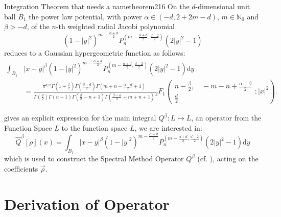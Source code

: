 





\begin{theorem}{Integration Theorem that needs a name}{theorem216}
  On the $d$-dimensional unit ball $B_1$ the power law potential, with power $\alpha \in(-d,2+2m-d)$, $m\in\mathbb{N}_0$ and $\beta>-d$, of the $n$-th weighted radial Jacobi polynomial $$(1-|y|^2)^{m-\frac{\alpha+d}{2}}P_n^{(m-\frac{\alpha+d}{2},\frac{d-2}{2})}(2|y|^2-1)$$ reduces to a Gaussian hypergeometric function as follows:
  \begin{align*}
    \int_{B_1} & |x-y|^\beta (1-|y|^2)^{m-\frac{\alpha+d}{2}} P_n^{(m-\frac{\alpha+d}{2},\frac{d-2}{2})}(2|y|^2-1) \mathrm{d}y                                                                                                                                                                                                                                                                                               \\
               & = \tfrac{\pi ^{d/2} \Gamma \left(1+\frac{\beta}{2}\right) \Gamma \left(\frac{\beta+d}{2}\right) \Gamma \left(m+n-\frac{\alpha+d}{2}+1\right)}{\Gamma \left(\frac{d}{2}\right) \Gamma (n+1) \Gamma \left(\frac{\beta}{2}-n+1\right) \Gamma \left(\frac{\beta-\alpha}{2}+m+n+1\right)}{}_2F_1\left(\begin{matrix}n-\frac{\beta}{2}, \quad -m-n+\frac{\alpha-\beta}{2} \\\frac{d}{2}\end{matrix};|x|^2\right).
  \end{align*}
\end{theorem}

 gives an explicit expression for the main integral
\(Q^{\beta}: L \mapsto L\), an operator from the Function Space \(L\) to the function space \(L\), we are interested in:
\[\hat{Q}^{\beta}[\rho](x) = \int_{B_1} |x-y|^\beta (1-|y|^2)^{m-\frac{\alpha+d}{2}} P_n^{(m-
  \frac{\alpha+d}{2},\frac{d-2}{2})}(2|y|^2-1) \mathrm{d}y\] which is used
to construct the Spectral Method Operator \(Q^\beta\) (cf. ), acting on the coefficients \(\vec{\rho}\).

\section{Derivation of Operator}


